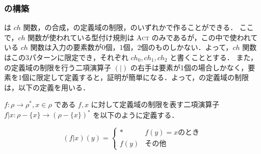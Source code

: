 


\subsubsection{\tmp の構築}

\tmp は $ch$ 関数，\tmp の合成，\tmp の定義域の制限，のいずれかで作ることができる．
ここで，$ch$ 関数が使われている型付け規則は \textsc{Act} のみであるが，この中で使われている $ch$ 関数は入力の要素数が0個，1個，2個のものしかない．よって，$ch$ 関数はこの3パターンに限定でき，それぞれ $ch_0, ch_1, ch_2$ と書くこととする．
また，\tmp の定義域の制限を行う二項演算子 $(|)$ の右手は要素が1個の場合しかなく，要素を1個に限定して定義すると，証明が簡単になる．よって，\tmp の定義域の制限は，以下の定義を用いる．


\begin{dfn}
  $f : \rho \rightarrow \rho^*, x \in \rho$ である $f, x$ に対して定義域の制限を表す二項演算子 $f | x : \rho - \{x\} \rightarrow (\rho - \{x\})^*$ を以下のように定義する． \\
\begin{adjustvboxheight}
  \[ (f | x)(y) = \begin{cases}
    \ast & f(y) = x \mbox{のとき} \\
    f(y) & \mbox{その他}
  \end{cases} \]
  \vspace{1pt}
\end{adjustvboxheight}
\end{dfn}


